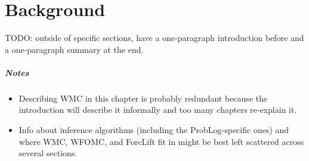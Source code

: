 \chapter{Background} %

TODO: outside of specific sections, have a one-paragraph introduction before and a one-paragraph summary at the end.

\paragraph{Notes}
\begin{itemize}
\item Describing WMC in this chapter is probably redundant because the introduction will describe it informally and too many chapters re-explain it.
\item Info about inference algorithms (including the ProbLog-specific ones) and where WMC, WFOMC, and ForcLift fit in might be best left scattered across several sections.
\end{itemize}

